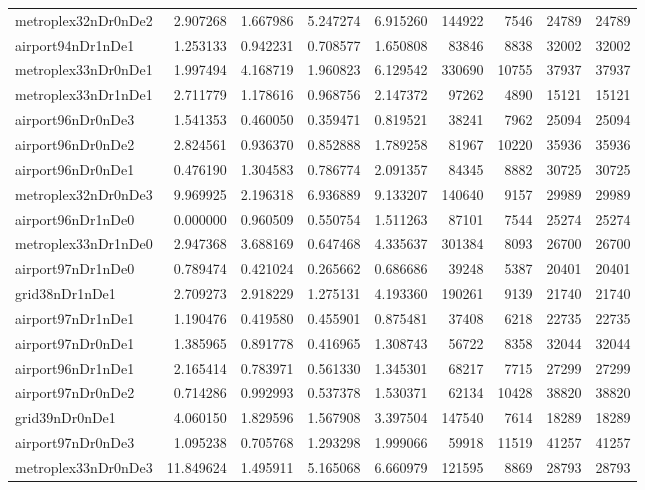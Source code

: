\begin{longtable}{|l|r|r|r|r|r|r|r|r|}
metroplex32nDr0nDe2 & 2.907268 & 1.667986 & 5.247274 & 6.915260 & 144922 & 7546 & 24789 & 24789 \\
airport94nDr1nDe1 & 1.253133 & 0.942231 & 0.708577 & 1.650808 & 83846 & 8838 & 32002 & 32002 \\
metroplex33nDr0nDe1 & 1.997494 & 4.168719 & 1.960823 & 6.129542 & 330690 & 10755 & 37937 & 37937 \\
metroplex33nDr1nDe1 & 2.711779 & 1.178616 & 0.968756 & 2.147372 & 97262 & 4890 & 15121 & 15121 \\
airport96nDr0nDe3 & 1.541353 & 0.460050 & 0.359471 & 0.819521 & 38241 & 7962 & 25094 & 25094 \\
airport96nDr0nDe2 & 2.824561 & 0.936370 & 0.852888 & 1.789258 & 81967 & 10220 & 35936 & 35936 \\
airport96nDr0nDe1 & 0.476190 & 1.304583 & 0.786774 & 2.091357 & 84345 & 8882 & 30725 & 30725 \\
metroplex32nDr0nDe3 & 9.969925 & 2.196318 & 6.936889 & 9.133207 & 140640 & 9157 & 29989 & 29989 \\
airport96nDr1nDe0 & 0.000000 & 0.960509 & 0.550754 & 1.511263 & 87101 & 7544 & 25274 & 25274 \\
metroplex33nDr1nDe0 & 2.947368 & 3.688169 & 0.647468 & 4.335637 & 301384 & 8093 & 26700 & 26700 \\
airport97nDr1nDe0 & 0.789474 & 0.421024 & 0.265662 & 0.686686 & 39248 & 5387 & 20401 & 20401 \\
grid38nDr1nDe1 & 2.709273 & 2.918229 & 1.275131 & 4.193360 & 190261 & 9139 & 21740 & 21740 \\
airport97nDr1nDe1 & 1.190476 & 0.419580 & 0.455901 & 0.875481 & 37408 & 6218 & 22735 & 22735 \\
airport97nDr0nDe1 & 1.385965 & 0.891778 & 0.416965 & 1.308743 & 56722 & 8358 & 32044 & 32044 \\
airport96nDr1nDe1 & 2.165414 & 0.783971 & 0.561330 & 1.345301 & 68217 & 7715 & 27299 & 27299 \\
airport97nDr0nDe2 & 0.714286 & 0.992993 & 0.537378 & 1.530371 & 62134 & 10428 & 38820 & 38820 \\
grid39nDr0nDe1 & 4.060150 & 1.829596 & 1.567908 & 3.397504 & 147540 & 7614 & 18289 & 18289 \\
airport97nDr0nDe3 & 1.095238 & 0.705768 & 1.293298 & 1.999066 & 59918 & 11519 & 41257 & 41257 \\
metroplex33nDr0nDe3 & 11.849624 & 1.495911 & 5.165068 & 6.660979 & 121595 & 8869 & 28793 & 28793 \\

\end{longtable}
